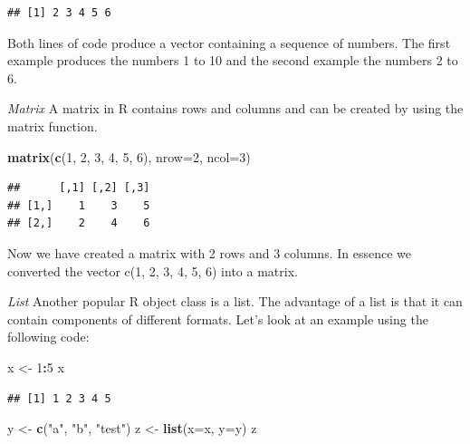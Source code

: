 \documentclass[]{book}
\newenvironment{Shaded}{\begin{snugshade}}{\end{snugshade}}
\newcommand{\KeywordTok}[1]{\textcolor[rgb]{0.13,0.29,0.53}{\textbf{#1}}}
\newcommand{\DataTypeTok}[1]{\textcolor[rgb]{0.13,0.29,0.53}{#1}}
\newcommand{\DecValTok}[1]{\textcolor[rgb]{0.00,0.00,0.81}{#1}}
\newcommand{\StringTok}[1]{\textcolor[rgb]{0.31,0.60,0.02}{#1}}
\newcommand{\OperatorTok}[1]{\textcolor[rgb]{0.81,0.36,0.00}{\textbf{#1}}}
\newcommand{\NormalTok}[1]{#1}
\theoremstyle{definition}
\theoremstyle{definition}
\theoremstyle{definition}
\theoremstyle{remark}
\begin{document}
\begin{verbatim}
## [1] 2 3 4 5 6
\end{verbatim}

Both lines of code produce a vector containing a sequence of numbers.
The first example produces the numbers 1 to 10 and the second example
the numbers 2 to 6.

\emph{Matrix} A matrix in R contains rows and columns and can be created
by using the matrix function.

\begin{Shaded}
\begin{Highlighting}[]
\KeywordTok{matrix}\NormalTok{(}\KeywordTok{c}\NormalTok{(}\DecValTok{1}\NormalTok{, }\DecValTok{2}\NormalTok{, }\DecValTok{3}\NormalTok{, }\DecValTok{4}\NormalTok{, }\DecValTok{5}\NormalTok{, }\DecValTok{6}\NormalTok{), }\DataTypeTok{nrow=}\DecValTok{2}\NormalTok{, }\DataTypeTok{ncol=}\DecValTok{3}\NormalTok{)}
\end{Highlighting}
\end{Shaded}

\begin{verbatim}
##      [,1] [,2] [,3]
## [1,]    1    3    5
## [2,]    2    4    6
\end{verbatim}

Now we have created a matrix with 2 rows and 3 columns. In essence we
converted the vector c(1, 2, 3, 4, 5, 6) into a matrix.

\emph{List} Another popular R object class is a list. The advantage of a
list is that it can contain components of different formats. Let's look
at an example using the following code:

\begin{Shaded}
\begin{Highlighting}[]
\NormalTok{x <-}\StringTok{ }\DecValTok{1}\OperatorTok{:}\DecValTok{5}
\NormalTok{x}
\end{Highlighting}
\end{Shaded}

\begin{verbatim}
## [1] 1 2 3 4 5
\end{verbatim}

\begin{Shaded}
\begin{Highlighting}[]
\NormalTok{y <-}\StringTok{ }\KeywordTok{c}\NormalTok{(}\StringTok{"a"}\NormalTok{, }\StringTok{"b"}\NormalTok{, }\StringTok{"test"}\NormalTok{)}
\NormalTok{z <-}\StringTok{ }\KeywordTok{list}\NormalTok{(}\DataTypeTok{x=}\NormalTok{x, }\DataTypeTok{y=}\NormalTok{y)}
\NormalTok{z}
\end{Highlighting}
\end{Shaded}
\end{document}
